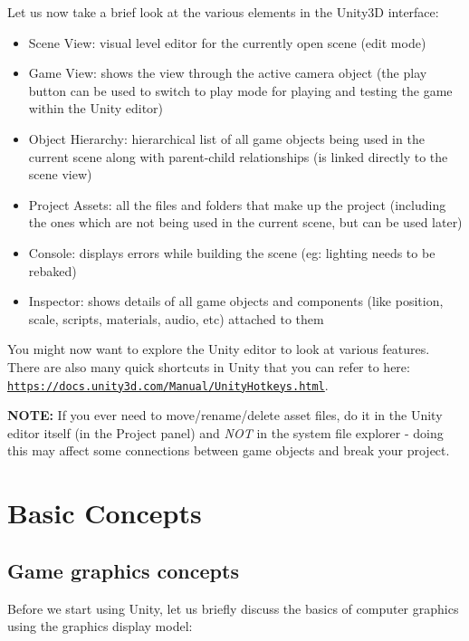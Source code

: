 \documentclass{article}[a4paper,12pt]
\theoremstyle{definition}
\begin{document}
Let us now take a brief look at the various elements in the Unity3D interface:
\begin{itemize}
	\item Scene View: visual level editor for the currently open scene (edit mode)
	\item Game View: shows the view through the active camera object (the play button can be used to switch to play mode for playing and testing the game within the Unity editor)
	\item Object Hierarchy: hierarchical list of all game objects being used in the current scene along with parent-child relationships (is linked directly to the scene view)
	\item Project Assets: all the files and folders that make up the project (including the ones which are not being used in the current scene, but can be used later)
	\item Console: displays errors while building the scene (eg: lighting needs to be rebaked)
	\item Inspector: shows details of all game objects and components (like position, scale, scripts, materials, audio, etc) attached to them
\end{itemize}
You might now want to explore the Unity editor to look at various features. There are also many quick shortcuts in Unity that you can refer to here: \texttt{\href{https://docs.unity3d.com/Manual/UnityHotkeys.html}{https://docs.unity3d.com/Manual/UnityHotkeys.html}}.
\vspace{6pt}

\textbf{NOTE:} If you ever need to move/rename/delete asset files, do it in the Unity editor itself (in the Project panel) and \textit{NOT} in the system file explorer - doing this may affect some connections between game objects and break your project.

\hrulefill
\pagebreak
\section{Basic Concepts}
\subsection{Game graphics concepts}
Before we start using Unity, let us briefly discuss the basics of computer graphics using the graphics display model:
\end{document}

